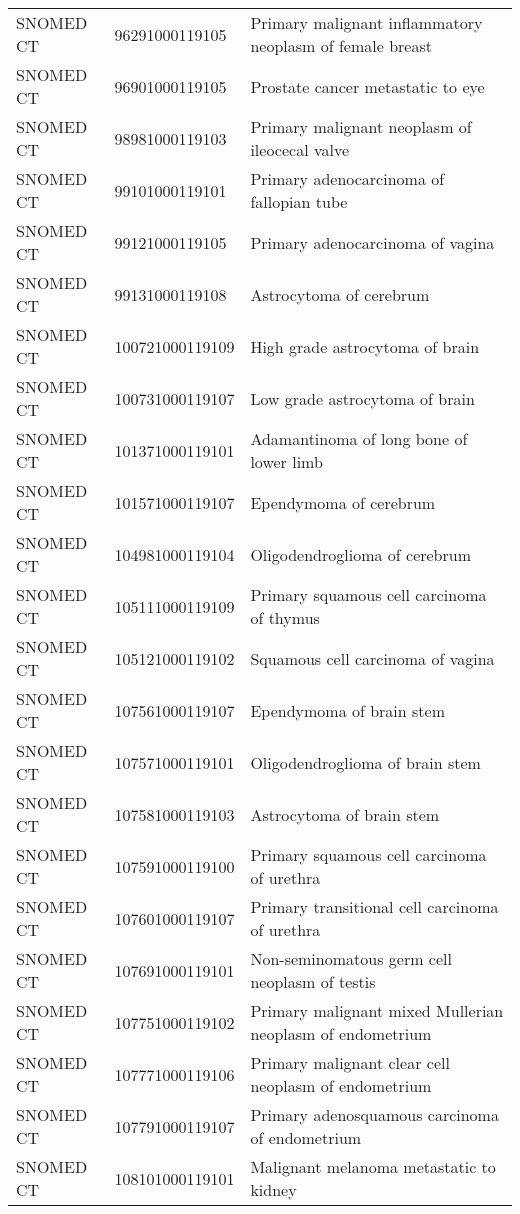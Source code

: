 \begin{longtable}{p{}p{}p{}}
  SNOMED CT & 96291000119105 & Primary malignant inflammatory neoplasm of female breast \\ 
  SNOMED CT & 96901000119105 & Prostate cancer metastatic to eye \\ 
  SNOMED CT & 98981000119103 & Primary malignant neoplasm of ileocecal valve \\ 
  SNOMED CT & 99101000119101 & Primary adenocarcinoma of fallopian tube \\ 
  SNOMED CT & 99121000119105 & Primary adenocarcinoma of vagina \\ 
  SNOMED CT & 99131000119108 & Astrocytoma of cerebrum \\ 
  SNOMED CT & 100721000119109 & High grade astrocytoma of brain \\ 
  SNOMED CT & 100731000119107 & Low grade astrocytoma of brain \\ 
  SNOMED CT & 101371000119101 & Adamantinoma of long bone of lower limb \\ 
  SNOMED CT & 101571000119107 & Ependymoma of cerebrum \\ 
  SNOMED CT & 104981000119104 & Oligodendroglioma of cerebrum \\ 
  SNOMED CT & 105111000119109 & Primary squamous cell carcinoma of thymus \\ 
  SNOMED CT & 105121000119102 & Squamous cell carcinoma of vagina \\ 
  SNOMED CT & 107561000119107 & Ependymoma of brain stem \\ 
  SNOMED CT & 107571000119101 & Oligodendroglioma of brain stem \\ 
  SNOMED CT & 107581000119103 & Astrocytoma of brain stem \\ 
  SNOMED CT & 107591000119100 & Primary squamous cell carcinoma of urethra \\ 
  SNOMED CT & 107601000119107 & Primary transitional cell carcinoma of urethra \\ 
  SNOMED CT & 107691000119101 & Non-seminomatous germ cell neoplasm of testis \\ 
  SNOMED CT & 107751000119102 & Primary malignant mixed Mullerian neoplasm of endometrium \\ 
  SNOMED CT & 107771000119106 & Primary malignant clear cell neoplasm of endometrium \\ 
  SNOMED CT & 107791000119107 & Primary adenosquamous carcinoma of endometrium \\ 
  SNOMED CT & 108101000119101 & Malignant melanoma metastatic to kidney \\ 

\end{longtable}
